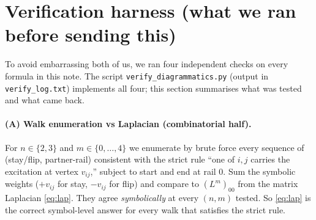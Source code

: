 \documentclass[11pt,a4paper]{article}
\begin{document}
\section{Verification harness (what we ran before sending this)}\label{sec:verify}

To avoid embarrassing both of us, we ran four independent checks on
every formula in this note. The script
\texttt{verify\_diagrammatics.py} (output in \texttt{verify\_log.txt})
implements all four; this section summarises what was tested and what
came back.

\paragraph{(A) Walk enumeration vs Laplacian (combinatorial half).}
For $n\!\in\!\{2,3\}$ and $m\!\in\!\{0,\dots,4\}$ we enumerate by
brute force every sequence of (stay/flip, partner-rail) consistent with
the strict rule ``one of $i,j$ carries the excitation at vertex
$v_{ij}$,'' subject to start and end at rail $0$. Sum the symbolic
weights ($+v_{ij}$ for stay, $-v_{ij}$ for flip) and compare to
$(L^{m})_{00}$ from the matrix Laplacian \eqref{eq:lap}. They agree
\emph{symbolically} at every $(n,m)$ tested. So \eqref{eq:lap} is the
correct symbol-level answer for every walk that satisfies the strict
rule.
\end{document}
